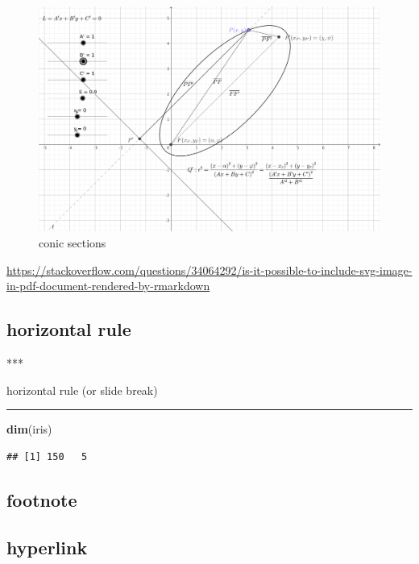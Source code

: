 \documentclass[
]{book}
\newenvironment{Shaded}{\begin{snugshade}}{\end{snugshade}}
\newcommand{\FunctionTok}[1]{\textcolor[rgb]{0.13,0.29,0.53}{\textbf{#1}}}
\newcommand{\NormalTok}[1]{#1}
\theoremstyle{definition}
\theoremstyle{definition}
\theoremstyle{definition}
\theoremstyle{definition}
\theoremstyle{remark}
\begin{document}
\begin{figure}
\includegraphics[width=0.75\linewidth]{img/conic-sections} \caption{conic sections}\label{fig:unnamed-chunk-26}
\end{figure}

\url{https://stackoverflow.com/questions/34064292/is-it-possible-to-include-svg-image-in-pdf-document-rendered-by-rmarkdown}

\subsection{horizontal rule}\label{horizontal-rule}

\begin{Shaded}
\begin{Highlighting}[]
\NormalTok{***}
\end{Highlighting}
\end{Shaded}

horizontal rule (or slide break)

\begin{center}\rule{0.5\linewidth}{0.5pt}\end{center}

\begin{Shaded}
\begin{Highlighting}[]
\FunctionTok{dim}\NormalTok{(iris) }
\end{Highlighting}
\end{Shaded}

\begin{verbatim}
## [1] 150   5
\end{verbatim}

\subsection{footnote}\label{footnote}

\subsection{hyperlink}\label{hyperlink}
\end{document}
